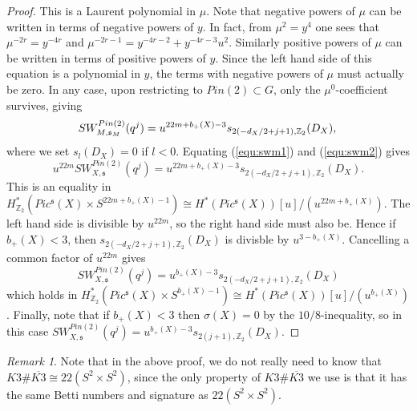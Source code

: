 \documentclass{amsart}
\theoremstyle{definition}
\theoremstyle{remark}
\newtheorem{remark}[theorem]{Remark}
\numberwithin{equation}{section}
\begin{document}
\begin{proof}
This is a Laurent polynomial in $\mu$. Note that negative powers of $\mu$ can be written in terms of negative powers of $y$. In fact, from $\mu^2 = y^4$ one sees that $\mu^{-2r} = y^{-4r}$ and $\mu^{-2r-1} = y^{-4r-2} + y^{-4r-3}u^2$. Similarly positive powers of $\mu$ can be written in terms of positive powers of $y$. Since the left hand side of this equation is a polynomial in $y$, the terms with negative powers of $\mu$ must actually be zero. In any case, upon restricting to $Pin(2) \subset G$, only the $\mu^0$-coefficient survives, giving
\begin{equation}\label{equ:swm2}
SW^{Pin(2)}_{M,\mathfrak{s}_M}(q^j) = u^{22m+b_+(X)-3}s_{2(-d_X/2+j+1),\mathbb{Z}_2}(D_X), \\
\end{equation}
where we set $s_l(D_X) = 0$ if $l < 0$. Equating (\ref{equ:swm1}) and (\ref{equ:swm2}) gives
\[
u^{22m} SW^{Pin(2)}_{X,\mathfrak{s}}(q^j) = u^{22m+b_+(X)-3}s_{2(-d_X/2+j+1),\mathbb{Z}_2}(D_X).
\]
This is an equality in $H^*_{\mathbb{Z}_2}( Pic^{\mathfrak{s}}(X) \times S^{22m+b_+(X)-1}) \cong H^*( Pic^{\mathfrak{s}}(X) )[u]/( u^{22m+b_+(X)})$. The left hand side is divisible by $u^{22m}$, so the right hand side must also be. Hence if $b_+(X) < 3$, then $s_{2(-d_X/2+j+1),\mathbb{Z}_2}(D_X)$ is divisble by $u^{3-b_+(X)}$. Cancelling a common factor of $u^{22m}$ gives
\[
SW^{Pin(2)}_{X , \mathfrak{s}}(q^j) = u^{b_+(X)-3} s_{2(-d_X/2+j+1) , \mathbb{Z}_2}(D_X)
\]
which holds in  $H^*_{\mathbb{Z}_2}( Pic^{\mathfrak{s}}(X) \times S^{b_+(X)-1}) \cong H^*( Pic^{\mathfrak{s}}(X) )[u]/( u^{b_+(X)})$. Finally, note that if $b_+(X) < 3$ then $\sigma(X) = 0$ by the $10/8$-inequality, so in this case $SW^{Pin(2)}_{X , \mathfrak{s}}(q^j) = u^{b_+(X)-3} s_{2(j+1) , \mathbb{Z}_2}(D_X)$.
\end{proof}

\begin{remark}
Note that in the above proof, we do not really need to know that $K3 \# \overline{K3} \cong 22(S^2 \times S^2)$, since the only property of $K3 \# \overline{K3}$ we use is that it has the same Betti numbers and signature as $22(S^2 \times S^2)$.
\end{remark}
\end{document}
